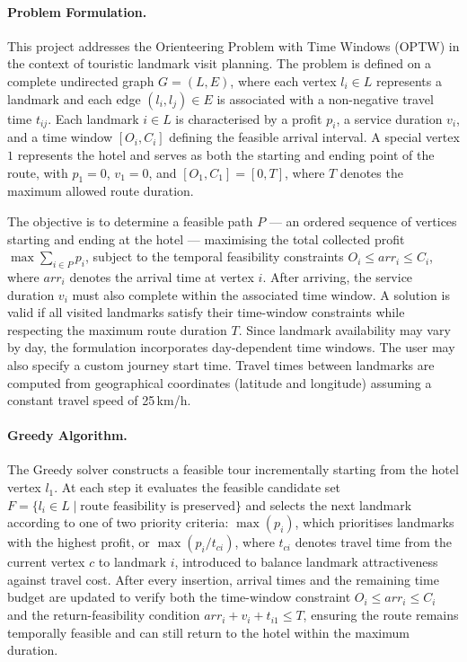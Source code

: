\paragraph{Problem Formulation.}

This project addresses the Orienteering Problem with Time Windows (OPTW) in the context of touristic landmark visit planning. The problem is defined on a complete undirected graph $G=(L,E)$, where each vertex $l_i \in L$ represents a landmark and each edge $(l_i,l_j)\in E$ is associated with a non-negative travel time $t_{ij}$. Each landmark $i\in L$ is characterised by a profit $p_i$, a service duration $v_i$, and a time window $[O_i,C_i]$ defining the feasible arrival interval. A special vertex $1$ represents the hotel and serves as both the starting and ending point of the route, with $p_1=0$, $v_1=0$, and $[O_1,C_1]=[0,T]$, where $T$ denotes the maximum allowed route duration.

The objective is to determine a feasible path $P$ --- an ordered sequence of vertices starting and ending at the hotel --- maximising the total collected profit $\max \sum_{i\in P} p_i$, subject to the temporal feasibility constraints $O_i \le \mathit{arr}_i \le C_i$, where $\mathit{arr}_i$ denotes the arrival time at vertex $i$. After arriving, the service duration $v_i$ must also complete within the associated time window. A solution is valid if all visited landmarks satisfy their time-window constraints while respecting the maximum route duration $T$. Since landmark availability may vary by day, the formulation incorporates day-dependent time windows. The user may also specify a custom journey start time. Travel times between landmarks are computed from geographical coordinates (latitude and longitude) assuming a constant travel speed of 25\,km/h.

\paragraph{Greedy Algorithm.}

The Greedy solver constructs a feasible tour incrementally starting from the hotel vertex $l_1$. At each step it evaluates the feasible candidate set $F = \{l_i \in L \mid \text{route feasibility is preserved}\}$ and selects the next landmark according to one of two priority criteria: $\max(p_i)$, which prioritises landmarks with the highest profit, or $\max(p_i / t_{ci})$, where $t_{ci}$ denotes travel time from the current vertex $c$ to landmark $i$, introduced to balance landmark attractiveness against travel cost. After every insertion, arrival times and the remaining time budget are updated to verify both the time-window constraint $O_i \le \mathit{arr}_i \le C_i$ and the return-feasibility condition $\mathit{arr}_i + v_i + t_{i1} \le T$, ensuring the route remains temporally feasible and can still return to the hotel within the maximum duration.


